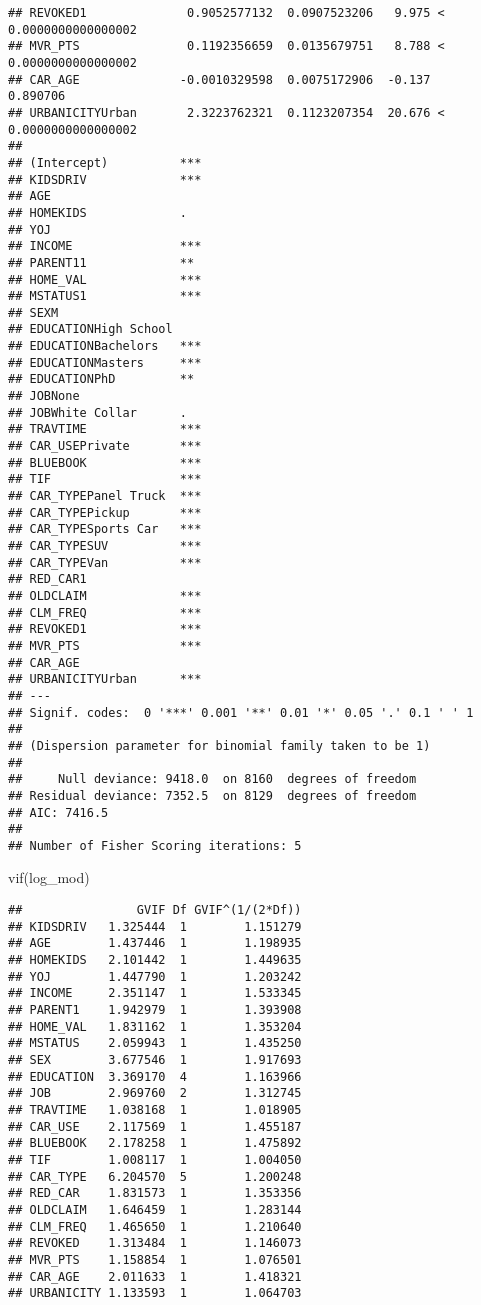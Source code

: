 \documentclass[
]{article}
\newenvironment{Shaded}{\begin{snugshade}}{\end{snugshade}}
\newcommand{\FunctionTok}[1]{\textcolor[rgb]{0.00,0.00,0.00}{#1}}
\newcommand{\NormalTok}[1]{#1}
\begin{document}
\begin{verbatim}
## REVOKED1              0.9052577132  0.0907523206   9.975 < 0.0000000000000002
## MVR_PTS               0.1192356659  0.0135679751   8.788 < 0.0000000000000002
## CAR_AGE              -0.0010329598  0.0075172906  -0.137             0.890706
## URBANICITYUrban       2.3223762321  0.1123207354  20.676 < 0.0000000000000002
##                         
## (Intercept)          ***
## KIDSDRIV             ***
## AGE                     
## HOMEKIDS             .  
## YOJ                     
## INCOME               ***
## PARENT11             ** 
## HOME_VAL             ***
## MSTATUS1             ***
## SEXM                    
## EDUCATIONHigh School    
## EDUCATIONBachelors   ***
## EDUCATIONMasters     ***
## EDUCATIONPhD         ** 
## JOBNone                 
## JOBWhite Collar      .  
## TRAVTIME             ***
## CAR_USEPrivate       ***
## BLUEBOOK             ***
## TIF                  ***
## CAR_TYPEPanel Truck  ***
## CAR_TYPEPickup       ***
## CAR_TYPESports Car   ***
## CAR_TYPESUV          ***
## CAR_TYPEVan          ***
## RED_CAR1                
## OLDCLAIM             ***
## CLM_FREQ             ***
## REVOKED1             ***
## MVR_PTS              ***
## CAR_AGE                 
## URBANICITYUrban      ***
## ---
## Signif. codes:  0 '***' 0.001 '**' 0.01 '*' 0.05 '.' 0.1 ' ' 1
## 
## (Dispersion parameter for binomial family taken to be 1)
## 
##     Null deviance: 9418.0  on 8160  degrees of freedom
## Residual deviance: 7352.5  on 8129  degrees of freedom
## AIC: 7416.5
## 
## Number of Fisher Scoring iterations: 5
\end{verbatim}

\begin{Shaded}
\begin{Highlighting}[]
\FunctionTok{vif}\NormalTok{(log\_mod)}
\end{Highlighting}
\end{Shaded}

\begin{verbatim}
##                GVIF Df GVIF^(1/(2*Df))
## KIDSDRIV   1.325444  1        1.151279
## AGE        1.437446  1        1.198935
## HOMEKIDS   2.101442  1        1.449635
## YOJ        1.447790  1        1.203242
## INCOME     2.351147  1        1.533345
## PARENT1    1.942979  1        1.393908
## HOME_VAL   1.831162  1        1.353204
## MSTATUS    2.059943  1        1.435250
## SEX        3.677546  1        1.917693
## EDUCATION  3.369170  4        1.163966
## JOB        2.969760  2        1.312745
## TRAVTIME   1.038168  1        1.018905
## CAR_USE    2.117569  1        1.455187
## BLUEBOOK   2.178258  1        1.475892
## TIF        1.008117  1        1.004050
## CAR_TYPE   6.204570  5        1.200248
## RED_CAR    1.831573  1        1.353356
## OLDCLAIM   1.646459  1        1.283144
## CLM_FREQ   1.465650  1        1.210640
## REVOKED    1.313484  1        1.146073
## MVR_PTS    1.158854  1        1.076501
## CAR_AGE    2.011633  1        1.418321
## URBANICITY 1.133593  1        1.064703
\end{verbatim}
\end{document}
